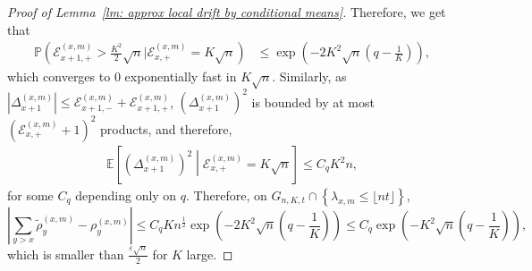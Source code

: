 \documentclass[twoside,12pt, a4paper]{article}
\numberwithin{equation}{section}
\theoremstyle{remark}
\newcommand{\abs}[1]{\left\vert #1 \right\vert}
\begin{document}
\begin{proof}[Proof of Lemma~\ref{lm: approx local drift by conditional means}]
		Therefore, we get that
		\begin{align*}
			\mathbb{P}(\mathcal{E}_{x+1,+}^{(x,m)} > \frac{K^2}{2} \sqrt{n} | \mathcal{E}_{x,+}^{(x, m)} = K \sqrt{n})
			&\le \exp\left( - 2 K^2 \sqrt{n}(q - \frac{1}{K})  \right) 
			,
		\end{align*}
		which converges to $0$ exponentially fast in $K \sqrt{n}$. Similarly, as $\abs{\Delta_{x+1}^{(x,m)}} \leq  \mathcal{E}_{x+1,-}^{(x,m)} + \mathcal{E}_{x+1,+}^{(x,m)}$,  $ \left(\Delta_{x+1}^{(x,m)} \right)^2$ is bounded by at most $ (\mathcal{E}_{x,+}^{(x,m)}+1)^2$ products, and therefore,
		\begin{align*}
			\mathbb{E}\left[ \left(\Delta_{x+1}^{(x,m)}\right)^2 \middle| \mathcal{E}_{x,+}^{(x,m)} = K \sqrt{n}  \right]  \leq C_q K^2 n,
		\end{align*}
		for some $C_q$ depending only on $q$.
		Therefore, on $G_{n,K,t} \cap \left\{ \lambda_{x,m} \leq\lfloor nt \rfloor \right\}$,
		\begin{equation}\label{eq: difference of cond means}
			\left| \sum_{y > x} \tilde\rho_y^{(x,m)} - \rho_y^{(x,m)} \right| \le C_q K n^{\frac{1}{2}} \exp\left( - 2K^2 \sqrt{n}(q - \frac{1}{K}) \right) \leq  C_q\exp\left( - K^2 \sqrt{n}(q - \frac{1}{K}) \right), 
		\end{equation}
		which is smaller than $\frac{\varepsilon \sqrt{n}}{2}$ for $K$ large.
		
		
	

\end{proof}
\end{document}
